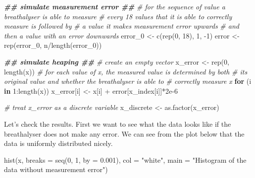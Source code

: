 \documentclass[
  11pt,
]{article}
\newenvironment{Shaded}{\begin{snugshade}}{\end{snugshade}}
\newcommand{\AttributeTok}[1]{\textcolor[rgb]{0.77,0.63,0.00}{#1}}
\newcommand{\CommentTok}[1]{\textcolor[rgb]{0.56,0.35,0.01}{\textit{#1}}}
\newcommand{\ControlFlowTok}[1]{\textcolor[rgb]{0.13,0.29,0.53}{\textbf{#1}}}
\newcommand{\DecValTok}[1]{\textcolor[rgb]{0.00,0.00,0.81}{#1}}
\newcommand{\DocumentationTok}[1]{\textcolor[rgb]{0.56,0.35,0.01}{\textbf{\textit{#1}}}}
\newcommand{\FloatTok}[1]{\textcolor[rgb]{0.00,0.00,0.81}{#1}}
\newcommand{\FunctionTok}[1]{\textcolor[rgb]{0.00,0.00,0.00}{#1}}
\newcommand{\NormalTok}[1]{#1}
\newcommand{\OtherTok}[1]{\textcolor[rgb]{0.56,0.35,0.01}{#1}}
\newcommand{\SpecialCharTok}[1]{\textcolor[rgb]{0.00,0.00,0.00}{#1}}
\newcommand{\StringTok}[1]{\textcolor[rgb]{0.31,0.60,0.02}{#1}}
\begin{document}
\begin{Shaded}
\begin{Highlighting}[]
\DocumentationTok{\#\# simulate measurement error \#\#}
\CommentTok{\# for the sequence of value a breathalyser is able to measure}
\CommentTok{\# every 18 values that it is able to correctly measure is followed by}
\CommentTok{\# a value it makes measurement error upwards}
\CommentTok{\# and then a value with an error downwards}
\NormalTok{error\_0 }\OtherTok{\textless{}{-}} \FunctionTok{c}\NormalTok{(}\FunctionTok{rep}\NormalTok{(}\DecValTok{0}\NormalTok{, }\DecValTok{18}\NormalTok{), }\DecValTok{1}\NormalTok{, }\SpecialCharTok{{-}}\DecValTok{1}\NormalTok{)}
\NormalTok{error }\OtherTok{\textless{}{-}} \FunctionTok{rep}\NormalTok{(error\_0, n}\SpecialCharTok{/}\FunctionTok{length}\NormalTok{(error\_0))}

\DocumentationTok{\#\# simulate heaping \#\#}
\CommentTok{\# create an empty vector}
\NormalTok{x\_error }\OtherTok{\textless{}{-}} \FunctionTok{rep}\NormalTok{(}\DecValTok{0}\NormalTok{, }\FunctionTok{length}\NormalTok{(x))}
\CommentTok{\# for each value of x, the measured value is determined by both}
\CommentTok{\# its original value and whether the breathalyser is able to }
\CommentTok{\# correctly measure x}
\ControlFlowTok{for}\NormalTok{ (i }\ControlFlowTok{in} \DecValTok{1}\SpecialCharTok{:}\FunctionTok{length}\NormalTok{(x)) x\_error[i] }\OtherTok{\textless{}{-}}\NormalTok{ x[i] }\SpecialCharTok{+}\NormalTok{ error[x\_index[i]]}\SpecialCharTok{*}\FloatTok{2e{-}6}

\CommentTok{\# treat x\_error as a discrete variable}
\NormalTok{x\_discrete }\OtherTok{\textless{}{-}} \FunctionTok{as.factor}\NormalTok{(x\_error)}
\end{Highlighting}
\end{Shaded}

Let's check the results. First we want to see what the data looks like
if the breathalyser does not make any error. We can see from the plot
below that the data is uniformly distributed nicely.

\begin{Shaded}
\begin{Highlighting}[]
\FunctionTok{hist}\NormalTok{(x, }\AttributeTok{breaks =} \FunctionTok{seq}\NormalTok{(}\DecValTok{0}\NormalTok{, }\DecValTok{1}\NormalTok{, }\AttributeTok{by =} \FloatTok{0.001}\NormalTok{), }\AttributeTok{col =} \StringTok{"white"}\NormalTok{,}
     \AttributeTok{main =} \StringTok{"Histogram of the data without measurement error"}\NormalTok{)}
\end{Highlighting}
\end{Shaded}
\end{document}
